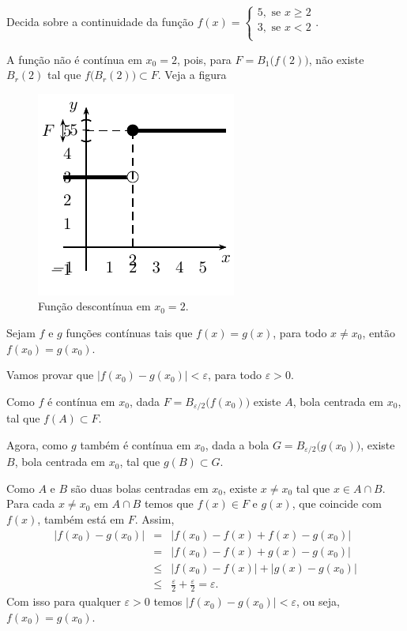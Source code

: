 \documentclass[11pt, oneside, a4paper]{gsm-l}
\begin{document}
\begin{exem}
  Decida sobre a continuidade da função $f(x)=
  \begin{cases}
    5, \mbox{ se }x \geq 2\\
    3, \mbox{ se }x < 2\\
  \end{cases}$.

  A função não é contínua em $x_0=2$, pois, para $F=B_1\big(f(2)\big)$,
  não existe $B_r(2)$ tal que $f\big(B_r(2)\big)\subset F$. Veja a
  figura 

  \begin{figure}[h]
    \centering
    \includegraphics{./figuras/fig04}
    \caption{Função descontínua em $x_0=2$.}
    \label{fig:funcdescexem}
  \end{figure}
\end{exem}

\begin{teo}
  Sejam $f$ e $g$ funções contínuas tais que $f(x)=g(x)$, para todo $x
  \ne x_0$, então $f(x_0)=g(x_0)$.
\end{teo}

\begin{dem}
  Vamos provar que $\big|f(x_0)-g(x_0)\big|<\varepsilon$, para todo
  $\varepsilon>0$.

  Como $f$ é contínua em $x_0$, dada $F=B_{\varepsilon\slash
    2}\big(f(x_0)\big)$ existe $A$, bola centrada em $x_0$, tal que
  $f(A)\subset F$.

  Agora, como $g$ também é contínua em $x_0$, dada a bola
  $G=B_{\varepsilon\slash 2}\big(g(x_0)\big)$, existe $B$, bola
  centrada em $x_0$, tal que $g(B)\subset G$.

  Como $A$ e $B$ são duas bolas centradas em $x_0$, existe $x\ne x_0$
  tal que $x\in A \cap B$. Para cada $x\ne x_0$ em $A\cap B$ temos que
  $f(x)\in F$ e $g(x)$, que coincide com $f(x)$, também está em
  $F$. Assim,
  \begin{eqnarray*}
    \big|f(x_0)-g(x_0)\big|&=&\big|f(x_0)-f(x)+f(x)-g(x_0)\big|\\
    &=&\big|f(x_0)-f(x)+g(x)-g(x_0)\big|\\
    &\leq&\big|f(x_0)-f(x)\big|+\big|g(x)-g(x_0)\big|\\
    &\leq&\frac{\varepsilon}{2} + \frac{\varepsilon}{2}=\varepsilon.
  \end{eqnarray*}
  Com isso para qualquer $\varepsilon>0$ temos
  $\big|f(x_0)-g(x_0)\big|<\varepsilon$, ou seja, $f(x_0)=g(x_0)$.
\end{dem}
\end{document}
